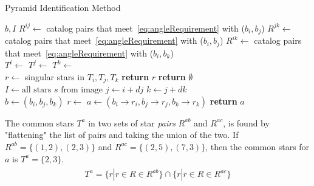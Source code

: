 \begin{algorithm}
    \caption{Pyramid Identification Method} \label{algorithm:pyramidIdentification}
    \begin{algorithmic}[1]
         {$b, I$}
        \State $R^{ij} \gets$ catalog pairs that meet~\eqref{eq:angleRequirement} with ($b_i, b_j$)
        \State $R^{jk} \gets$ catalog pairs that meet~\eqref{eq:angleRequirement} with ($b_i, b_j$)
        \State $R^{ik} \gets$ catalog pairs that meet~\eqref{eq:angleRequirement} with ($b_i, b_k$)
        \\
        \State $T^i \gets $ 
        \State $T^j \gets $ 
        \State $T^k \gets $ 
        \\
        \State $r \gets $ singular stars in $T_i, T_j, T_k$
        \State \textbf{return} $r$
        \EndIf
        \EndIf
        \State \textbf{return} $\emptyset$
        \EndFunction
        \\
        \State $I \gets \text{all stars } s \text{ from image}$
        \State $j \gets i + dj$
        \State $k \gets j + dk$
        \\
        \State $b \gets (b_i, b_j, b_k)$
        \State $r \gets$ 
        \State $a \gets (b_i \rightarrow r_i, b_j \rightarrow r_j, b_k \rightarrow r_k)$
        \State \textbf{return} $a$
        \EndIf
        \EndFor
        \EndFor
        \EndFor
        \EndProcedure
    \end{algorithmic}
\end{algorithm}

The common stars $T^a$ in two sets of star \textit{pairs} $R^{ab}$ and $R^{ac}$, is found by "flattening" the list of
pairs and taking the union of the two. If $R^{ab} = \{ (1, 2), (2, 3) \}$ and $R^{ac} = \{ (2, 5), (7, 3) \}$, then the
common stars for $a$ is $T^a = \{2, 3\}$.
\begin{align}
    \label{eq:commonStarsPyramid}
    \begin{split}
        T^a = \{ r | r \in R \in R^{ab} \} \cap \{ r | r \in R \in R^{ac} \}
    \end{split}
\end{align}

